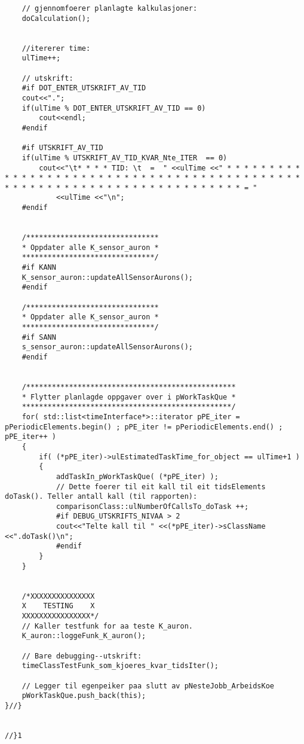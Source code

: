 \begin{lstlisting}
	// gjennomfoerer planlagte kalkulasjoner:
	doCalculation();


	//itererer time:
	ulTime++;

	// utskrift:
	#if DOT_ENTER_UTSKRIFT_AV_TID
	cout<<".";
	if(ulTime % DOT_ENTER_UTSKRIFT_AV_TID == 0)
		cout<<endl;
	#endif

	#if UTSKRIFT_AV_TID
	if(ulTime % UTSKRIFT_AV_TID_KVAR_Nte_ITER  == 0)		
		cout<<"\t* * * * TID: \t  =  " <<ulTime <<" * * * * * * * * * * * * * * * * * * * * * * * * * * * * * * * * * * * * * * * * * * * * * * * * * * * * * * * * * * * * * * * * * * * * * * * * = "
			<<ulTime <<"\n";
	#endif


	/*******************************
	* Oppdater alle K_sensor_auron *
	*******************************/
	#if KANN
	K_sensor_auron::updateAllSensorAurons();
	#endif

	/*******************************
	* Oppdater alle K_sensor_auron *
	*******************************/
	#if SANN
	s_sensor_auron::updateAllSensorAurons();
	#endif

	
	/*************************************************
	* Flytter planlagde oppgaver over i pWorkTaskQue *
	*************************************************/
	for( std::list<timeInterface*>::iterator pPE_iter = pPeriodicElements.begin() ; pPE_iter != pPeriodicElements.end() ; pPE_iter++ )
	{
		if( (*pPE_iter)->ulEstimatedTaskTime_for_object == ulTime+1 )
		{
			addTaskIn_pWorkTaskQue( (*pPE_iter) );
			// Dette foerer til eit kall til eit tidsElements doTask(). Teller antall kall (til rapporten):
			comparisonClass::ulNumberOfCallsTo_doTask ++;
			#if DEBUG_UTSKRIFTS_NIVAA > 2
			cout<<"Telte kall til " <<(*pPE_iter)->sClassName <<".doTask()\n";
			#endif
		}
 	}


	/*XXXXXXXXXXXXXXX
	X 	 TESTING 	X
	XXXXXXXXXXXXXXXX*/
	// Kaller testfunk for aa teste K_auron. 
	K_auron::loggeFunk_K_auron();

	// Bare debugging--utskrift:
	timeClassTestFunk_som_kjoeres_kvar_tidsIter();
	
	// Legger til egenpeiker paa slutt av pNesteJobb_ArbeidsKoe
	pWorkTaskQue.push_back(this);	
}//}


//}1




\end{lstlisting}
